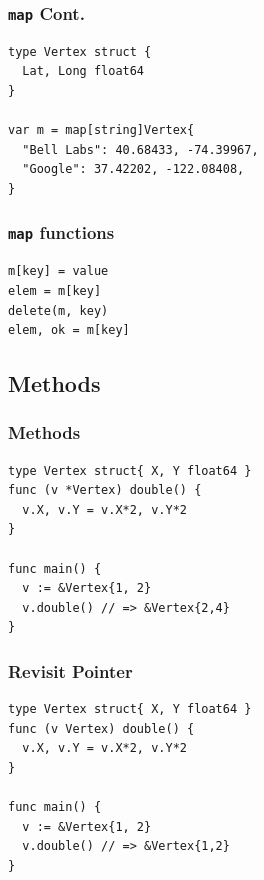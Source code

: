 \documentclass[xetex,mathserif,serif,12pt]{beamer}
\begin{document}
\begin{frame}[fragile]
  \frametitle{\texttt{map} Cont.}

  \begin{beamer@nomargin}
    \begin{lstlisting}
type Vertex struct {
  Lat, Long float64
}

var m = map[string]Vertex{
  "Bell Labs": 40.68433, -74.39967,
  "Google": 37.42202, -122.08408,
}
    \end{lstlisting}
  \end{beamer@nomargin}
\end{frame}

\begin{frame}[fragile]
  \frametitle{\texttt{map} functions}

  \begin{beamer@nomargin}
    \begin{lstlisting}
m[key] = value
elem = m[key]
delete(m, key)
elem, ok = m[key]
    \end{lstlisting}
  \end{beamer@nomargin}
\end{frame}

\subsection{Methods}

\begin{frame}[fragile]
  \frametitle{Methods}

  \begin{beamer@nomargin}
    \begin{lstlisting}
type Vertex struct{ X, Y float64 }
func (v *Vertex) double() {
  v.X, v.Y = v.X*2, v.Y*2
}

func main() {
  v := &Vertex{1, 2}
  v.double() // => &Vertex{2,4}
}
    \end{lstlisting}
  \end{beamer@nomargin}
\end{frame}

\begin{frame}[fragile]
  \frametitle{Revisit Pointer}

  \begin{beamer@nomargin}
    \begin{lstlisting}
type Vertex struct{ X, Y float64 }
func (v Vertex) double() {
  v.X, v.Y = v.X*2, v.Y*2
}

func main() {
  v := &Vertex{1, 2}
  v.double() // => &Vertex{1,2}
}
    \end{lstlisting}
  \end{beamer@nomargin}
\end{frame}
\end{document}
